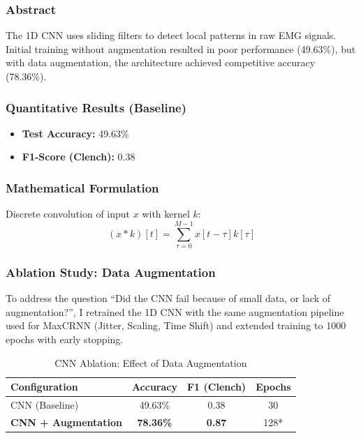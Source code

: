 \documentclass{article}
\begin{document}
\subsubsection{Abstract}
The 1D CNN uses sliding filters to detect local patterns in raw EMG signals. Initial training without augmentation resulted in poor performance (49.63\%), but with data augmentation, the architecture achieved competitive accuracy (78.36\%).

\subsubsection{Quantitative Results (Baseline)}
\begin{itemize}
    \item \textbf{Test Accuracy:} 49.63\%
    \item \textbf{F1-Score (Clench):} 0.38
\end{itemize}

\subsubsection{Mathematical Formulation}
Discrete convolution of input $x$ with kernel $k$:
\begin{equation}
    (x * k)[t] = \sum_{\tau=0}^{M-1} x[t-\tau]k[\tau]
\end{equation}

\subsubsection{Ablation Study: Data Augmentation}
To address the question ``Did the CNN fail because of small data, or lack of augmentation?'', I retrained the 1D CNN with the same augmentation pipeline used for MaxCRNN (Jitter, Scaling, Time Shift) and extended training to 1000 epochs with early stopping.

\begin{table}[h]
    \centering
    \caption{CNN Ablation: Effect of Data Augmentation}
    \begin{tabular}{l c c c}
        \hline
        \textbf{Configuration} & \textbf{Accuracy} & \textbf{F1 (Clench)} & \textbf{Epochs} \\
        \hline
        CNN (Baseline) & 49.63\% & 0.38 & 30 \\
        \textbf{CNN + Augmentation} & \textbf{78.36\%} & \textbf{0.87} & 128* \\
        \hline
    \end{tabular}
\end{table}
\end{document}
